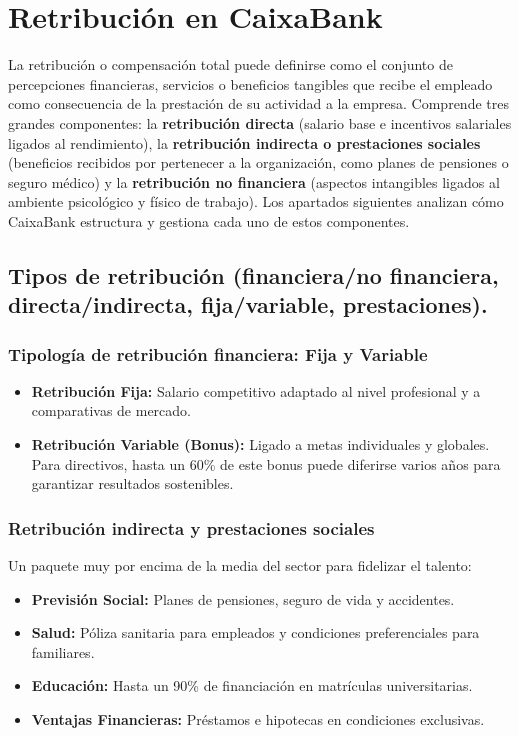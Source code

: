 \chapter{Retribución en CaixaBank}

La retribución o compensación total puede definirse como el conjunto de percepciones financieras, servicios o beneficios tangibles que recibe el empleado como consecuencia de la prestación de su actividad a la empresa. Comprende tres grandes componentes: la \textbf{retribución directa} (salario base e incentivos salariales ligados al rendimiento), la \textbf{retribución indirecta o prestaciones sociales} (beneficios recibidos por pertenecer a la organización, como planes de pensiones o seguro médico) y la \textbf{retribución no financiera} (aspectos intangibles ligados al ambiente psicológico y físico de trabajo). Los apartados siguientes analizan cómo CaixaBank estructura y gestiona cada uno de estos componentes.

\section{Tipos de retribución (financiera/no financiera, directa/indirecta, fija/variable, prestaciones).}

\subsection{Tipología de retribución financiera: Fija y Variable}
\begin{itemize}[leftmargin=*]
    \item \textbf{Retribución Fija:} Salario competitivo adaptado al nivel profesional y a comparativas de mercado.
    \item \textbf{Retribución Variable (Bonus):} Ligado a metas individuales y globales. Para directivos, hasta un 60\% de este bonus puede diferirse varios años para garantizar resultados sostenibles.
\end{itemize}

\subsection{Retribución indirecta y prestaciones sociales}
Un paquete muy por encima de la media del sector para fidelizar el talento:
\begin{itemize}[leftmargin=*]
    \item \textbf{Previsión Social:} Planes de pensiones, seguro de vida y accidentes.
    \item \textbf{Salud:} Póliza sanitaria para empleados y condiciones preferenciales para familiares.
    \item \textbf{Educación:} Hasta un 90\% de financiación en matrículas universitarias.
    \item \textbf{Ventajas Financieras:} Préstamos e hipotecas en condiciones exclusivas.
\end{itemize}

